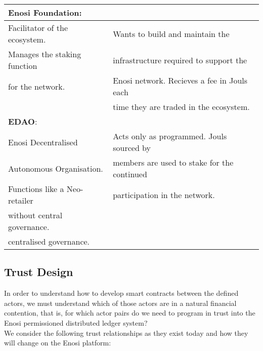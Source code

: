\documentclass{article}
\theoremstyle{definition}
\theoremstyle{plain} %
\begin{document}
\begin{tabular}{|l|l|}
 \textbf{Enosi Foundation}:		& \\
 \hline 
 Facilitator of the ecosystem.	& Wants to build and maintain the 				\\
 Manages the staking function	& infrastructure required to support the 		\\
 for the network.				& Enosi network. Recieves a fee in Jouls each	\\
 								& time they are traded in the ecosystem.		\\
 \hline 

 \textbf{EDAO}:					& \\
 \hline 
 Enosi Decentralised 			& Acts only as programmed. Jouls sourced by		\\
 Autonomous Organisation.		& members are used to stake for the continued	\\
 Functions like a Neo-retailer	& participation in the network. \\
 without central governance. 	& \\
 centralised governance.		& \\
 \hline
\end{tabular}


\subsection{Trust Design}

In order to understand how to develop smart contracts between the defined actors, we must understand which of those actors are in a natural financial contention, that is, for which actor pairs do we need to program in trust into the Enosi permissioned distributed ledger system? \\

\noindent We consider the following trust relationships as they exist today and how they will change on the Enosi platform:
\end{document}
